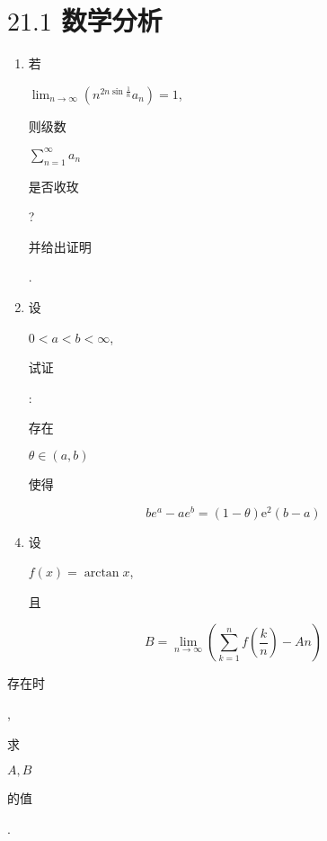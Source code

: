 \documentclass[10pt]{article}
\begin{document}
\section{$21.1$ 数学分析}
\begin{enumerate}
  \item \begin{CJK}{UTF8}{mj}若\end{CJK} $\lim _{n \rightarrow \infty}\left(n^{2 n \sin \frac{1}{n}} a_{n}\right)=1$, \begin{CJK}{UTF8}{mj}则级数\end{CJK} $\sum_{n=1}^{\infty} a_{n}$ \begin{CJK}{UTF8}{mj}是否收玫\end{CJK}? \begin{CJK}{UTF8}{mj}并给出证明\end{CJK}.

  \item \begin{CJK}{UTF8}{mj}设\end{CJK} $0<a<b<\infty$, \begin{CJK}{UTF8}{mj}试证\end{CJK}: \begin{CJK}{UTF8}{mj}存在\end{CJK} $\theta \in(a, b)$ \begin{CJK}{UTF8}{mj}使得\end{CJK}

\end{enumerate}
$$
b e^{a}-a e^{b}=(1-\theta) \mathrm{e}^{2}(b-a)
$$

\begin{enumerate}
  \setcounter{enumi}{3}
  \item \begin{CJK}{UTF8}{mj}设\end{CJK} $f(x)=\arctan x$, \begin{CJK}{UTF8}{mj}且\end{CJK}
\end{enumerate}
$$
B=\lim _{n \rightarrow \infty}\left(\sum_{k=1}^{n} f\left(\frac{k}{n}\right)-A n\right)
$$
\begin{CJK}{UTF8}{mj}存在时\end{CJK}, \begin{CJK}{UTF8}{mj}求\end{CJK} $A, B$ \begin{CJK}{UTF8}{mj}的值\end{CJK}.
\end{document}

